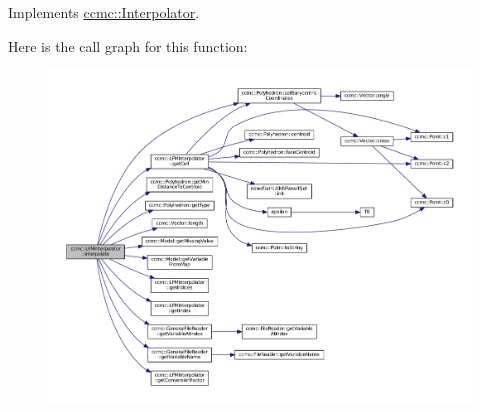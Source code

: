 Implements \hyperlink{classccmc_1_1_interpolator_aa6b272bd53630020d92938ec1e5cfad9}{ccmc\-::\-Interpolator}.



Here is the call graph for this function\-:
\nopagebreak
\begin{figure}[H]
\begin{center}
\leavevmode
\includegraphics[width=350pt]{classccmc_1_1_l_f_m_interpolator_aafa40bcb1aae6e232bc9b883cc8df160_cgraph}
\end{center}
\end{figure}


